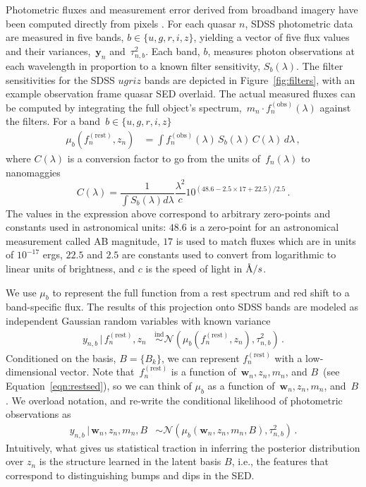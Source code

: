 \documentclass{article} %
\begin{document}
Photometric fluxes and measurement error derived from broadband imagery have been computed directly from pixels \cite{stoughton2002sloan}.  
For each quasar $n$, SDSS photometric data are measured in five bands, ${b \in \{u,g,r,i,z\}}$, yielding a vector of five flux values and their variances,~$\mathbf{y}_n$ and~$\tau^2_{n, b}$.  
Each band, $b$, measures photon observations at each wavelength in proportion to a known filter sensitivity, $S_{b}(\lambda)$. 
The filter sensitivities for the SDSS $ugriz$ bands are depicted in Figure~\ref{fig:filters}, with an example observation frame quasar SED overlaid.  
The actual measured fluxes can be computed by integrating the full object's spectrum,~${m_n \cdot f_n^{(\text{obs})}(\lambda)}$ against the filters.
For a band~${b \in \{u, g, r, i, z \}}$
\begin{align}
  \mu_b(f_n^{(\text{rest})}, z_n) &= \int f^{(\text{obs})}_n(\lambda) \,S_b(\lambda)\, C(\lambda) \,d \lambda \,,
\end{align}
where $C(\lambda)$ is a conversion factor to go from the units of~$f_n(\lambda)$ to nanomaggies
\begin{equation*}
C(\lambda) = \frac{1}{\int S_b(\lambda) d\lambda} \frac{\lambda^2}{c} 10^{(48.6-2.5\times 17+22.5)/2.5} \, .
\end{equation*}
The values in the expression above correspond to arbitrary zero-points and constants used in astronomical units: $48.6$ is a zero-point for an astronomical measurement called AB magnitude, $17$ is used to match fluxes which are in units of $10^{-17}$ ergs, $22.5$ and $2.5$ are constants used to convert from logarithmic to linear units of brightness, and $c$ is the speed of light in $\textup{\AA}/s$.  

 We use $\mu_b$ to represent the full function from a rest spectrum and red shift to a band-specific flux.
 The results of this projection onto SDSS bands are modeled as independent Gaussian random variables with known variance
\begin{align}
  y_{n,b}\, |\, f_n^{(\text{rest})}, z_n 
    &\stackrel{\textrm{ind}}{\sim} 
      \mathcal{N}( \mu_b(f_n^{(\text{rest})}, z_n), \tau^2_{n,b} ) \, .
\end{align}
Conditioned on the basis, ${B = \{B_k\}}$, we can represent $f_n^{(\text{rest})}$ with a low-dimensional vector.
Note that~$f_n^{(\text{rest})}$ is a function of~${\mathbf{w}_n, z_n, m_n}$, and $B$~(see Equation~\ref{eqn:restsed}), so we can think of $\mu_b$ as a function of~${\mathbf{w}_n, z_n, m_n}$, and~$B$.
We overload notation, and re-write the conditional likelihood of photometric observations as
\begin{align}
    y_{n,b} \,|\, \mathbf{w}_n, z_n, m_n, B &\sim \mathcal{N}( \mu_b(\mathbf{w}_n, z_n, m_n, B), \tau^2_{n,b} ) \, .
   \label{eq:phot}
\end{align}
Intuitively, what gives us statistical traction in inferring the posterior distribution over $z_n$ is the structure learned in the latent basis $B$, i.e., the features that correspond to distinguishing bumps and dips in the SED.
\end{document}

